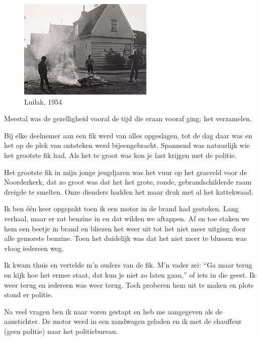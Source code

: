 \documentclass[12pt,twoside, openright]{memoir}
\begin{document}
\begin{figure}
\includegraphics[width=\textwidth]{img/ch9/luilak1954}
\caption*{\footnotesize Luilak, 1954}
\end{figure}

Meestal was de gezelligheid vooral de tijd die eraan vooraf ging: het verzamelen. 

Bij elke deelnemer aan een fik werd van alles opgeslagen, tot de dag daar was en het op de plek van ontsteken werd bijeengebracht. Spannend was natuurlijk wie het grootste fik had. Als het te groot was kon je last krijgen met de politie.

Het grootste fik in mijn jonge jeugdjaren was het vuur op het grasveld voor de Noorderkerk, dat zo groot was dat het het grote, ronde, gebrandschilderde raam dreigde te smelten. Onze dienders hadden het maar druk met al het kattekwaad. 

Ik ben één keer opgepakt toen ik een motor in de brand had gestoken. Lang verhaal, maar er zat benzine in en dat wilden we aftappen. Af en toe staken we hem een beetje in brand en bliezen het weer uit tot het niet meer uitging door alle gemorste benzine. Toen het duidelijk was dat het niet meer te blussen was vloog iedereen weg. 

Ik kwam thuis en vertelde m’n ouders van de fik. M’n vader zei: ``Ga maar terug en kijk hoe het ermee staat, dat kun je niet zo laten gaan,'' of iets in die geest. Ik weer terug en iedereen was weer terug. Toch proberen hem uit te maken en plots stond er politie. 

Na veel vragen ben ik naar voren gestapt en heb me aangegeven als de aanstichter. De motor werd in een zandwagen geladen en ik met de chauffeur (geen politie) naar het politiebureau. 
\end{document}
